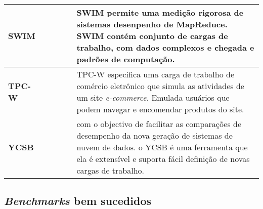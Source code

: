 \begin{center}
\begin{longtable}{| m{2cm} | m{1.5cm} | m{1.7cm} | m{2cm} | m{1.5cm} | p{5.5cm} |}
		\\ 
		\hline
		\textbf{SWIM} & \thereIs & \thereIs & \thereNotIs & \thereIs & SWIM permite uma medição rigorosa de sistemas desenpenho de MapReduce. SWIM contém conjunto de cargas de trabalho, com dados complexos e chegada e padrões de computação. 
		\\ 
		\hline
		\textbf{TPC-W} & \thereIs & \thereIs & \thereIs & \thereIs & TPC-W especifica uma carga de trabalho de comércio eletrônico que simula as atividades de um site \textit{e-commerce}.
		Emulada usuários que podem navegar e encomendar produtos do site. \cite{Menasce2002}
		\\ 		
		\hline
		\textbf{YCSB} & \thereIs & \thereIs & \thereIs & \thereIs & com o objectivo de facilitar as comparações de desempenho da nova geração de sistemas de nuvem de dados. o YCSB é uma ferramenta que ela é extensível e suporta fácil definição de novas cargas de trabalho. \cite{Cooper2010}
		\\ 
		\hline
	\end{longtable}
\end{center}

\subsection{\textit{Benchmarks} bem sucedidos}
